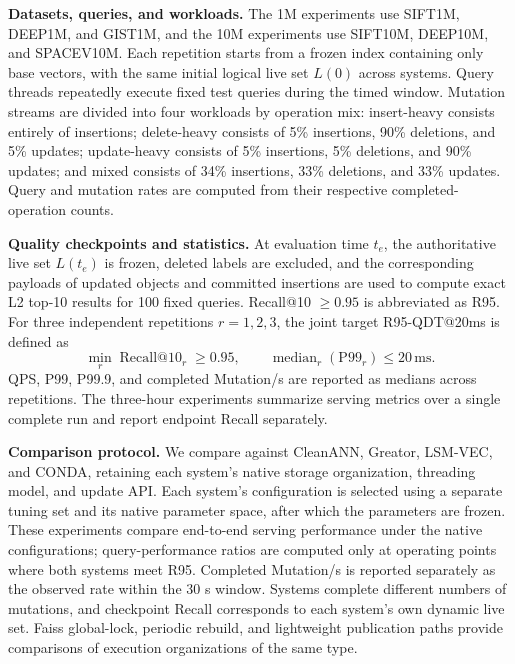 \documentclass[sigconf,pbalance]{acmart}
\begin{document}
\textbf{Datasets, queries, and workloads.} The 1M experiments use SIFT1M, DEEP1M, and GIST1M, and the 10M experiments use SIFT10M, DEEP10M, and SPACEV10M. Each repetition starts from a frozen index containing only base vectors, with the same initial logical live set $L(0)$ across systems. Query threads repeatedly execute fixed test queries during the timed window. Mutation streams are divided into four workloads by operation mix: insert-heavy consists entirely of insertions; delete-heavy consists of 5\% insertions, 90\% deletions, and 5\% updates; update-heavy consists of 5\% insertions, 5\% deletions, and 90\% updates; and mixed consists of 34\% insertions, 33\% deletions, and 33\% updates. Query and mutation rates are computed from their respective completed-operation counts.

\textbf{Quality checkpoints and statistics.} At evaluation time $t_e$, the authoritative live set $L(t_e)$ is frozen, deleted labels are excluded, and the corresponding payloads of updated objects and committed insertions are used to compute exact L2 top-10 results for 100 fixed queries. Recall@10 $\geq 0.95$ is abbreviated as R95. For three independent repetitions $r=1,2,3$, the joint target R95-QDT@20ms is defined as
\begin{equation}
\label{eq:quality-target}
\min_r\operatorname{Recall@10}_r\geq0.95,\qquad
\operatorname{median}_r(\mathrm{P99}_r)\leq20\,\mathrm{ms}.
\end{equation}
QPS, P99, P99.9, and completed Mutation/s are reported as medians across repetitions. The three-hour experiments summarize serving metrics over a single complete run and report endpoint Recall separately.

\textbf{Comparison protocol.} We compare against CleanANN, Greator, LSM-VEC, and CONDA, retaining each system's native storage organization, threading model, and update API. Each system's configuration is selected using a separate tuning set and its native parameter space, after which the parameters are frozen. These experiments compare end-to-end serving performance under the native configurations; query-performance ratios are computed only at operating points where both systems meet R95. Completed Mutation/s is reported separately as the observed rate within the 30 s window. Systems complete different numbers of mutations, and checkpoint Recall corresponds to each system's own dynamic live set. Faiss global-lock, periodic rebuild, and lightweight publication paths provide comparisons of execution organizations of the same type.
\end{document}
